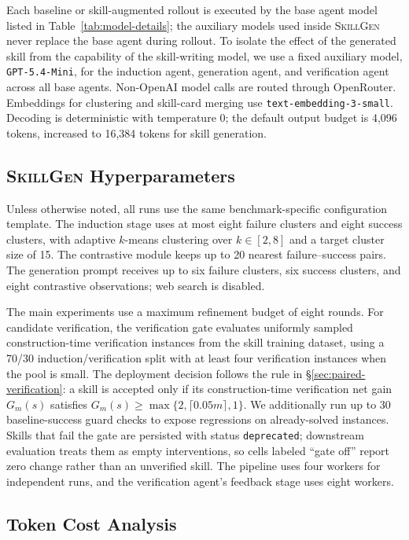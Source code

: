 \documentclass{article}
\begin{document}
Each baseline or skill-augmented rollout is executed by the base agent model listed in Table~\ref{tab:model-details}; the auxiliary models used inside \textsc{SkillGen} never replace the base agent during rollout. To isolate the effect of the generated skill from the capability of the skill-writing model, we use a fixed auxiliary model, \texttt{GPT-5.4-Mini}, for the induction agent, generation agent, and verification agent across all base agents. Non-OpenAI model calls are routed through OpenRouter. Embeddings for clustering and skill-card merging use \texttt{text-embedding-3-small}. Decoding is deterministic with temperature 0; the default output budget is 4{,}096 tokens, increased to 16{,}384 tokens for skill generation.

\subsection{\textsc{SkillGen} Hyperparameters}
\label{app:skillgen-hyperparameters}

Unless otherwise noted, all runs use the same benchmark-specific configuration template. The induction stage uses at most eight failure clusters and eight success clusters, with adaptive $k$-means clustering over $k\in[2,8]$ and a target cluster size of 15. The contrastive module keeps up to 20 nearest failure--success pairs. The generation prompt receives up to six failure clusters, six success clusters, and eight contrastive observations; web search is disabled.

The main experiments use a maximum refinement budget of eight rounds. For candidate verification, the verification gate evaluates uniformly sampled construction-time verification instances from the skill training dataset, using a 70/30 induction/verification split with at least four verification instances when the pool is small. The deployment decision follows the rule in \S\ref{sec:paired-verification}: a skill is accepted only if its construction-time verification net gain $G_m(s)$ satisfies $G_m(s)\ge \max\{2,\lceil 0.05m\rceil,1\}$.
We additionally run up to 30 baseline-success guard checks to expose regressions on already-solved instances. Skills that fail the gate are persisted with status \texttt{deprecated}; downstream evaluation treats them as empty interventions, so cells labeled ``gate off'' report zero change rather than an unverified skill. The pipeline uses four workers for independent runs, and the verification agent's feedback stage uses eight workers.

\subsection{Token Cost Analysis}
\label{app:token-cost}
\end{document}

